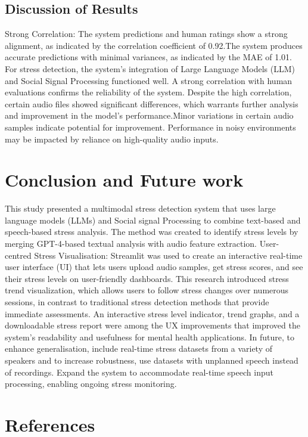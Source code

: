 \documentclass[a4j, twocolumn]{article}
\begin{document}
  \subsection{Discussion of Results}
     Strong Correlation: The system predictions and human ratings show a strong alignment, as indicated by the correlation coefficient of 0.92.The system produces accurate predictions with minimal variances, as indicated by the MAE of 1.01. For stress detection, the system's integration of Large Language Models (LLM) and Social Signal Processing functioned well. A strong correlation with human evaluations confirms the reliability of the system. Despite the high correlation, certain audio files showed significant differences, which warrants further analysis and improvement in the model's performance.Minor variations in certain audio samples indicate potential for improvement. Performance in noisy environments may be impacted by reliance on high-quality audio inputs.
\section{Conclusion and Future work}
This study presented a multimodal stress detection system that uses large language models (LLMs) and Social signal Processing to combine text-based and speech-based stress analysis. The method was created to identify stress levels by merging GPT-4-based textual analysis with audio feature extraction. User-centred Stress Visualisation: Streamlit was used to create an interactive real-time user interface (UI) that lets users upload audio samples, get stress scores, and see their stress levels on user-friendly dashboards. This research introduced stress trend visualization, which allows users to follow stress changes over numerous sessions, in contrast to traditional stress detection methods that provide immediate assessments. An interactive stress level indicator, trend graphs, and a downloadable stress report were among the UX improvements that improved the system's readability and usefulness for mental health applications. In future, to enhance generalisation, include real-time stress datasets from a variety of speakers and to increase robustness, use datasets with unplanned speech instead of recordings. Expand the system to accommodate real-time speech input processing, enabling ongoing stress monitoring.
\section*{References}
\end{document}
